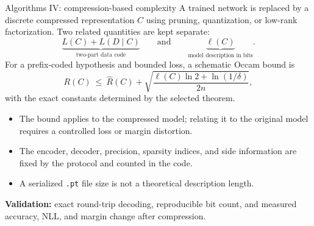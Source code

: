 \documentclass[aspectratio=169,notheorems]{beamer}
\newcommand{\code}[1]{\texttt{#1}}
\begin{document}
\begin{frame}[shrink=3]{Algorithms IV: compression-based complexity}
\small
A trained network is replaced by a discrete compressed representation $C$ using
pruning, quantization, or low-rank factorization. Two related quantities are kept separate:
\[
\underbrace{L(C)+L(D\mid C)}_{\text{two-part data code}}
\qquad\text{and}\qquad
\underbrace{\ell(C)}_{\text{model description in bits}}.
\]
For a prefix-coded hypothesis and bounded loss, a schematic Occam bound is
\[
R(C)\ \leq\ \widehat R(C)+
\sqrt{\frac{\ell(C)\ln 2+\ln(1/\delta)}{2n}},
\]
with the exact constants determined by the selected theorem.

\begin{itemize}\setlength{\itemsep}{0.32em}
  \item The bound applies to the compressed model; relating it to the original model
        requires a controlled loss or margin distortion.
  \item The encoder, decoder, precision, sparsity indices, and side information are
        fixed by the protocol and counted in the code.
  \item A serialized \code{.pt} file size is not a theoretical description length.
\end{itemize}

\textbf{Validation:} exact round-trip decoding, reproducible bit count, and measured
accuracy, NLL, and margin change after compression.
\end{frame}
\end{document}
